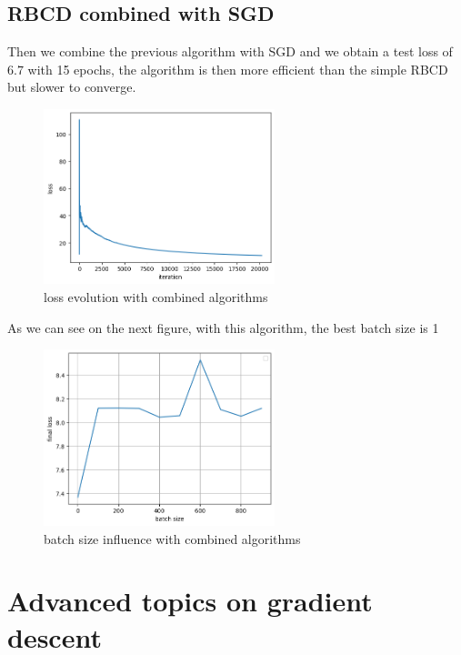 \documentclass{article}
\begin{document}
    \newpage

    \subsection{RBCD combined with SGD}

    Then we combine the previous algorithm with SGD and we obtain a test loss of $6.7$ with 15 epochs, the algorithm is then more efficient than the simple RBCD but slower to converge.

    \begin{figure}[!h]
    \centering
    \includegraphics[width=0.6\textwidth]{images/part6_3.png}
    \caption{loss evolution with combined algorithms}
    \label{fig:sg3}
    \end{figure}  

    As we can see on the next figure, with this algorithm, the best batch size is 1

    \begin{figure}[!h]
    \centering
    \includegraphics[width=0.6\textwidth]{images/part6_4.png}
    \caption{batch size influence with combined algorithms}
    \label{fig:sg3}
    \end{figure}  

    \newpage

\section{Advanced topics on gradient descent}
\end{document}
